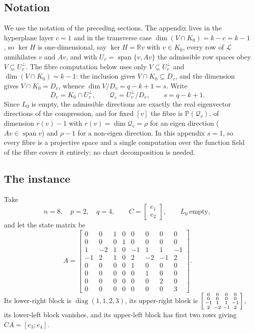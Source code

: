\documentclass[journal]{IEEEtran}
\theoremstyle{plainn}
\theoremstyle{remark}
\begin{document}
\subsection{Notation}\label{sec6:sub:notation}


We use the notation of the preceding sections. The appendix lives in the hyperplane layer $c=1$ and in
the transverse case $\dim(V\cap K_0)=k-c=k-1$, so $\ker H$ is one-dimensional, say
$\ker H=\mathbb{R}v$ with $v\in K_0$, every row of $\mathcal{L}$ annihilates $v$ and $Av$, and with
$U_v=\operatorname{span}\{v,Av\}$ the admissible row spaces obey $V\subseteq U_v^{\perp}$. The fibre
computation below uses only $V\subseteq U_v^{\perp}$ and $\dim(V\cap K_0)=k-1$: the inclusion gives
$V\cap K_0\subseteq D_v$, and the dimension gives $V\cap K_0=D_v$, whence $\dim V/D_v=q-k+1=s$. Write
\begin{equation}\label{sec6:eq:defs}
D_v=K_0\cap U_v^{\perp},\qquad \mathcal{Q}_v=U_v^{\perp}/D_v,\qquad s=q-k+1 .
\end{equation}
Since $L_0$ is empty, the admissible directions are exactly the real eigenvector directions of the
compression, and for fixed $[v]$ the fibre is $\mathbb{P}(\mathcal{Q}_v)$, of dimension $r(v)-1$ with
$r(v)=\dim\mathcal{Q}_v=\rho$ for an eigen direction ($Av\in\operatorname{span}v$) and $\rho-1$ for a
non-eigen direction. In this appendix $s=1$, so every fibre is a projective space and a single
computation over the function field of the fibre covers it entirely: no chart decomposition is needed.


\subsection{The instance}\label{sec6:sub:instance}


Take
\begin{equation}\label{sec6:eq:data}
n=8,\quad p=2,\quad q=4,\qquad
C=\begin{bmatrix}e_1\\ e_2\end{bmatrix},\qquad L_0\ \text{empty},
\end{equation}
and let the state matrix be
\begin{equation}\label{sec6:eq:A}
A=\begin{bmatrix}
0&0&1&0&0&0&0&0\\
0&0&0&1&0&0&0&0\\
1&-2&1&0&-1&1&1&-1\\
-1&2&1&0&2&-2&-1&2\\
0&0&0&0&1&0&0&0\\
0&0&0&0&0&1&0&0\\
0&0&0&0&0&0&2&0\\
0&0&0&0&0&0&0&3
\end{bmatrix}.
\end{equation}
Its lower-right block is $\operatorname{diag}(1,1,2,3)$, its upper-right block is
$\begin{bsmallmatrix}0&0&0&0\\0&0&0&0\\-1&1&1&-1\\2&-2&-1&2\end{bsmallmatrix}$, its lower-left block
vanishes, and its upper-left block has first two rows giving $CA=[e_3;e_4]$.
\end{document}

